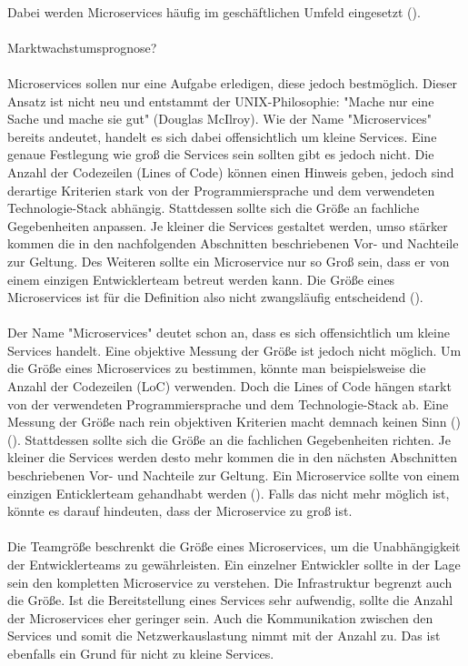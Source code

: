 \\
Dabei werden Microservices häufig im geschäftlichen Umfeld eingesetzt (\cite[S. 15]{newmanMicroservices2015}). \\
\\
Marktwachstumsprognose? \\
\\
Microservices sollen nur eine Aufgabe erledigen, diese jedoch bestmöglich. Dieser Ansatz ist nicht neu und entstammt der UNIX-Philosophie: "Mache nur eine Sache und mache sie gut" (Douglas McIlroy).
Wie der Name "Microservices" bereits andeutet, handelt es sich dabei offensichtlich um kleine Services. Eine genaue Festlegung wie groß die Services sein sollten gibt es jedoch nicht. Die Anzahl der Codezeilen (Lines of Code) können einen Hinweis geben, jedoch sind derartige Kriterien stark von der Programmiersprache und dem verwendeten Technologie-Stack abhängig. Stattdessen sollte sich die Größe an fachliche Gegebenheiten anpassen. Je kleiner die Services gestaltet werden, umso stärker kommen die in den nachfolgenden Abschnitten beschriebenen Vor- und Nachteile zur Geltung. Des Weiteren sollte ein Microservice nur so Groß sein, dass er von einem einzigen Entwicklerteam betreut werden kann. Die Größe eines Microservices ist für die Definition also nicht zwangsläufig entscheidend (\cite[S. 2]{wolffMicroservices2018}). \\
\\
Der Name "Microservices" deutet schon an, dass es sich offensichtlich um kleine Services handelt.
Eine objektive Messung der Größe ist jedoch nicht möglich. Um die Größe eines Microservices zu bestimmen, könnte man beispielsweise die Anzahl der Codezeilen (LoC) verwenden. Doch die Lines of Code hängen starkt von der verwendeten Programmiersprache und dem Technologie-Stack ab. Eine Messung der Größe nach rein objektiven Kriterien macht demnach keinen Sinn (\cite[S. 31]{wolffMicroservices2018})(\cite[S. 22]{newmanMicroservices2015}). Stattdessen sollte sich die Größe an die fachlichen Gegebenheiten richten. Je kleiner die Services werden desto mehr kommen die in den nächsten Abschnitten beschriebenen Vor- und Nachteile zur Geltung. Ein Microservice sollte von einem einzigen Enticklerteam gehandhabt werden (\cite[S. 23]{newmanMicroservices2015}). Falls das nicht mehr möglich ist, könnte es darauf hindeuten, dass der Microservice zu groß ist. \\
\\
Die Teamgröße beschrenkt die Größe eines Microservices, um die Unabhängigkeit der Entwicklerteams zu gewährleisten. Ein einzelner Entwickler sollte in der Lage sein den kompletten Microservice zu verstehen. Die Infrastruktur begrenzt auch die Größe. Ist die Bereitstellung eines Services sehr aufwendig, sollte die Anzahl der Microservices eher geringer sein. Auch die Kommunikation zwischen den Services und somit die Netzwerkauslastung nimmt mit der Anzahl zu. Das ist ebenfalls ein Grund für nicht zu kleine Services.
